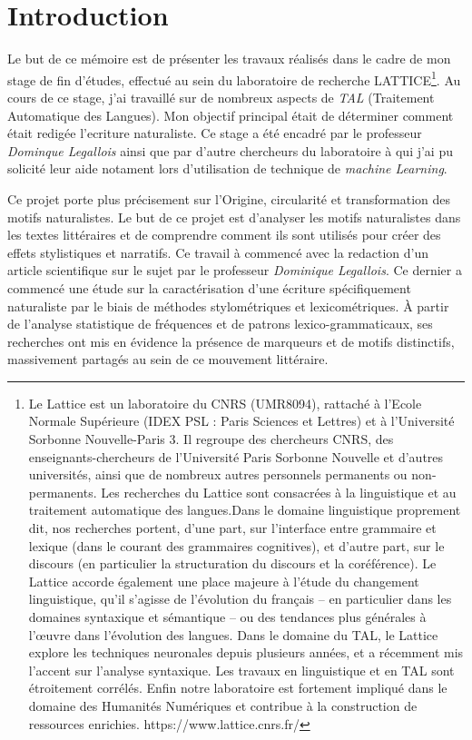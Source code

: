 \chapter*{Introduction}

Le but de ce mémoire est de présenter les travaux réalisés dans le cadre de mon stage de fin d'études, effectué au sein du laboratoire de recherche LATTICE\footnote{Le Lattice est un laboratoire du CNRS (UMR8094), rattaché à l’Ecole Normale Supérieure (IDEX PSL : Paris Sciences et Lettres) et à l’Université Sorbonne Nouvelle-Paris 3. Il regroupe des chercheurs CNRS, des enseignants-chercheurs de l’Université Paris Sorbonne Nouvelle et d’autres universités, ainsi que de nombreux autres personnels permanents ou non-permanents.
Les recherches du Lattice sont consacrées à la linguistique et au traitement automatique des langues.Dans le domaine linguistique proprement dit, nos recherches portent, d’une part, sur l’interface entre grammaire et lexique (dans le courant des grammaires cognitives), et d’autre part, sur le discours (en particulier la structuration du discours et la coréférence).
Le Lattice accorde également une place majeure à l’étude du changement linguistique, qu’il s’agisse de l’évolution du français – en particulier dans les domaines syntaxique et sémantique – ou des tendances plus générales à l’œuvre dans l’évolution des langues.
Dans le domaine du TAL, le Lattice explore les techniques neuronales depuis plusieurs années, et a récemment mis l’accent sur l’analyse syntaxique. Les travaux en linguistique et en TAL sont étroitement corrélés.
Enfin notre laboratoire est fortement impliqué dans le domaine des Humanités Numériques et contribue à la construction de ressources enrichies. https://www.lattice.cnrs.fr/ }. Au cours de ce stage, j’ai travaillé sur de nombreux aspects de \textit{TAL} (Traitement Automatique des Langues). Mon objectif principal était de déterminer comment était redigée l'ecriture naturaliste. Ce stage a été encadré par le professeur \textit{Dominque Legallois} ainsi que par d'autre chercheurs du laboratoire à qui j'ai pu solicité leur aide notament lors d'utilisation de technique de \textit{machine Learning}. 
 
Ce projet porte plus précisement sur l'Origine, circularité et transformation des motifs naturalistes. Le but de ce projet est d'analyser les motifs naturalistes dans les textes littéraires et de comprendre comment ils sont utilisés pour créer des effets stylistiques et narratifs. Ce travail à commencé avec la redaction d'un article scientifique sur le sujet par le professeur \textit{Dominique Legallois}. Ce dernier a commencé une étude sur la caractérisation d'une écriture spécifiquement naturaliste par le biais de méthodes stylométriques et lexicométriques. À partir de l'analyse statistique de fréquences et de patrons lexico-grammaticaux, ses recherches ont mis en évidence la présence de marqueurs et de motifs distinctifs, massivement partagés au sein de ce mouvement littéraire.


